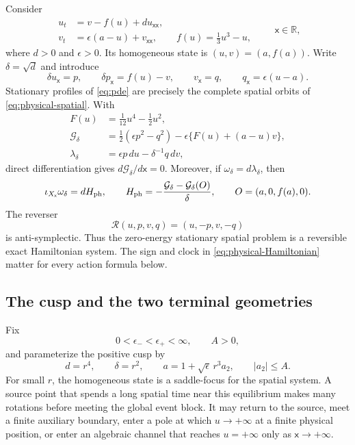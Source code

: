 \documentclass[11pt,reqno]{amsart}
\numberwithin{equation}{section}
\theoremstyle{definition}
\theoremstyle{remark}
\newcommand{\R}{\mathbb R}
\newcommand{\cG}{\mathcal G}
\newcommand{\cR}{\mathcal R}
\begin{document}
Consider
\begin{equation}\label{eq:pde}
 \begin{aligned}
  u_t&=v-f(u)+d u_{\mathsf x\mathsf x},\\
  v_t&=\epsilon(a-u)+v_{\mathsf x\mathsf x},
  \qquad f(u)=\frac13u^3-u,
 \end{aligned}
 \qquad \mathsf x\in\R,
\end{equation}
where $d>0$ and $\epsilon>0$.  Its homogeneous state is
$(u,v)=(a,f(a))$.  Write $\delta=\sqrt d$ and introduce
\begin{equation}\label{eq:physical-spatial}
 \delta u_{\mathsf x}=p,\qquad
 \delta p_{\mathsf x}=f(u)-v,\qquad
 v_{\mathsf x}=q,\qquad
 q_{\mathsf x}=\epsilon(u-a).
\end{equation}
Stationary profiles of \eqref{eq:pde} are precisely the complete spatial
orbits of \eqref{eq:physical-spatial}.  With
\begin{equation}\label{eq:G-lambda}
 \begin{aligned}
  F(u)&=\frac1{12}u^4-\frac12u^2,\\
  \cG_\delta
  &=\frac12(\epsilon p^2-q^2)
    -\epsilon\{F(u)+(a-u)v\},\\
  \lambda_\delta&=\epsilon p\,du-\delta^{-1}q\,dv,
 \end{aligned}
\end{equation}
direct differentiation gives $d\cG_\delta/d\mathsf x=0$.  Moreover, if
$\omega_\delta=d\lambda_\delta$, then
\begin{equation}\label{eq:physical-Hamiltonian}
 \iota_{X_{\mathsf x}}\omega_\delta
   =dH_{\rm ph},\qquad
 H_{\rm ph}=-\frac{\cG_\delta-\cG_\delta(O)}{\delta},
 \qquad O=(a,0,f(a),0).
\end{equation}
The reverser
\begin{equation}\label{eq:reverser}
 \cR(u,p,v,q)=(u,-p,v,-q)
\end{equation}
is anti-symplectic.  Thus the zero-energy stationary spatial problem is a
reversible exact Hamiltonian system.  The sign and clock in
\eqref{eq:physical-Hamiltonian} matter for every action formula below.

\subsection{The cusp and the two terminal geometries}

Fix
\begin{equation}\label{eq:fixed-epsilon-A}
 0<\epsilon_-<\epsilon_+<\infty,\qquad A>0,
\end{equation}
and parameterize the positive cusp by
\begin{equation}\label{eq:cusp}
 d=r^4,\qquad \delta=r^2,\qquad
 a=1+\sqrt\epsilon\,r^3a_2,\qquad |a_2|\le A.
\end{equation}
For small $r$, the homogeneous state is a saddle-focus for the spatial
system.  A source point that spends a long spatial time near this equilibrium
makes many rotations before meeting the global event block.  It may return
to the source, meet a finite auxiliary boundary, enter a pole at which
$u\to+\infty$ at a finite physical position, or enter an algebraic channel
that reaches $u=+\infty$ only as $\mathsf x\to+\infty$.
\end{document}
